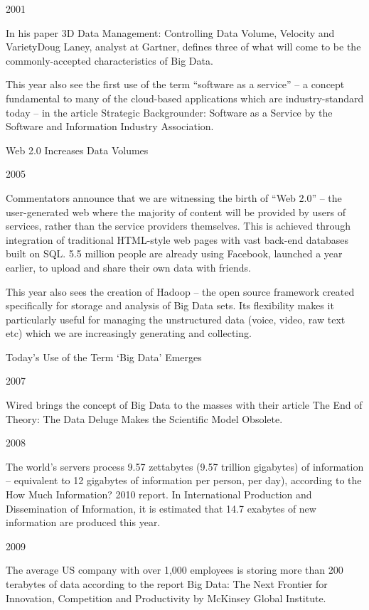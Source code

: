 2001

In his paper 3D Data Management: Controlling Data Volume, Velocity and VarietyDoug Laney, analyst at Gartner, defines three of what will come to be the commonly-accepted characteristics of Big Data.

This year also see the first use of the term “software as a service” – a concept fundamental to many of the cloud-based applications which are industry-standard today – in the article Strategic Backgrounder: Software as a Service by the Software and Information Industry Association.

Web 2.0 Increases Data Volumes

2005

Commentators announce that we are witnessing the birth of “Web 2.0” – the user-generated web where the majority of content will be provided by users of services, rather than the service providers themselves. This is achieved through integration of traditional HTML-style web pages with vast back-end databases built on SQL. 5.5 million people are already using Facebook, launched a year earlier, to upload and share their own data with friends.

This year also sees the creation of Hadoop – the open source framework created specifically for storage and analysis of Big Data sets. Its flexibility makes it particularly useful for managing the unstructured data (voice, video, raw text etc) which we are increasingly generating and collecting.

Today’s Use of the Term ‘Big Data’ Emerges

2007

Wired brings the concept of Big Data to the masses with their article The End of Theory: The Data Deluge Makes the Scientific Model Obsolete.

2008

The world’s servers process 9.57 zettabytes (9.57 trillion gigabytes) of information – equivalent to 12 gigabytes of information per person, per day), according to the How Much Information? 2010 report. In International Production and Dissemination of Information, it is estimated that 14.7 exabytes of new information are produced this year.

2009

The average US company with over 1,000 employees is storing more than 200 terabytes of data according to the report Big Data: The Next Frontier for Innovation, Competition and Productivity by McKinsey Global Institute.

